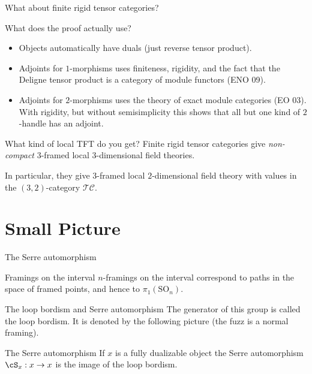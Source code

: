 \documentclass[beamer]{beamer}
\newlength{\arrowlength}
\begin{document}
\begin{frame}{What about finite rigid tensor categories?}
\begin{block}{What does the proof actually use?}
\begin{itemize}
\item Objects automatically have duals (just reverse tensor product).
\item Adjoints for $1$-morphisms uses finiteness, rigidity, and the fact that the Deligne tensor product is a category of module functors (ENO 09).
\item Adjoints for $2$-morphisms uses the theory of exact module categories (EO 03).  With rigidity, but without semisimplicity this shows that all but one kind of $2$-handle has an adjoint.
\end{itemize}
\end{block}

\begin{block}{What kind of local TFT do you get?}
Finite rigid tensor categories give \emph{non-compact} $3$-framed local $3$-dimensional field theories.

In particular, they give $3$-framed local $2$-dimensional field theory with values in the $(3,2)$-category $\mathcal{TC}$.
\end{block}
\end{frame}

\section{Small Picture}

\begin{frame}{The Serre automorphism}
\begin{block}{Framings on the interval}
$n$-framings on the interval correspond to paths in the space of framed points, and hence to $\pi_1(\mathrm{SO}_n)$.
\end{block}

\begin{block}{The loop bordism and Serre automorphism}
The generator of this group is called the loop bordism.  It is denoted by the following picture (the fuzz is a normal framing).

\begin{center}
\end{center}

\end{block}

\begin{block}{The Serre automorphism}
If $x$ is a fully dualizable object the Serre automorphism $\cS_x: x \rightarrow x$ is the image of the loop bordism.
\end{block}
\end{frame}
\end{document}
